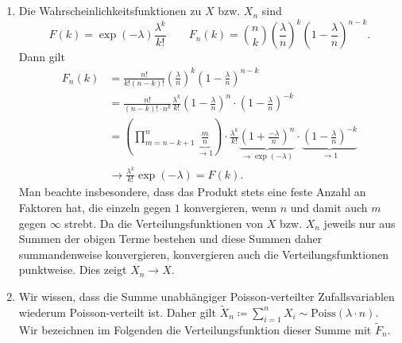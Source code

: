 \documentclass[a4paper]{article}
\begin{document}

\subsection{}


\subsection{}


\begin{enumerate}
    \item Die Wahrscheinlichkeitsfunktionen zu $X$ bzw. $X_n$ sind
    \begin{equation*}
        F(k) = \exp(- \lambda) \frac{\lambda^k}{k!} \qquad F_n(k) = \binom{n}{k} \left(\frac{\lambda}{n}\right)^{k} \left(1 - \frac{\lambda}{n}\right)^{n-k} \text{.}
    \end{equation*}
    Dann gilt
    \begin{align*}
        F_n(k) &= \frac{n!}{k!(n-k)!}  \left(\frac{\lambda}{n}\right)^{k} \left(1 - \frac{\lambda}{n}\right)^{n-k} \\
        &= \frac{n!}{(n-k)! \cdot n^k}  \frac{\lambda^k}{k!} \left(1 - \frac{\lambda}{n}\right)^n \cdot \left(1 - \frac{\lambda}{n}\right)^{-k}\\
        &= \left(\prod_{m=n-k+1}^{n} \underbrace{\frac{m}{n}}_{\to 1}\right) \cdot \frac{\lambda^k}{k!} \underbrace{\left(1 + \frac{-\lambda}{n}\right)^n}_{\to \exp(-\lambda)} \cdot \underbrace{\left(1 - \frac{\lambda}{n}\right)^{-k}}_{\to 1}\\
        &\to \frac{\lambda^k}{k!} \exp(-\lambda) = F(k)\text{.}
    \end{align*}
    Man beachte insbesondere, dass das Produkt stets eine feste Anzahl an Faktoren hat, die einzeln gegen $1$ konvergieren, wenn $n$ und damit auch $m$ gegen $\infty$ strebt. Da die Verteilungsfunktionen von $X$ bzw. $X_n$ jeweils nur aus Summen der obigen Terme bestehen und diese Summen daher summandenweise konvergieren, konvergieren auch die Verteilungsfunktionen punktweise. Dies zeigt $X_n \to X$.
    \item Wir wissen, dass die Summe unabhängiger Poisson-verteilter Zufallsvariablen wiederum Poisson-verteilt ist.
    Daher gilt $\tilde{X}_n \coloneq \sum_{i = 1}^{n} X_i \sim \mathrm{Poiss}(\lambda \cdot n)$.
    Wir bezeichnen im Folgenden die Verteilungsfunktion dieser Summe mit $\tilde{F}_n$.

\end{enumerate}
\end{document}
